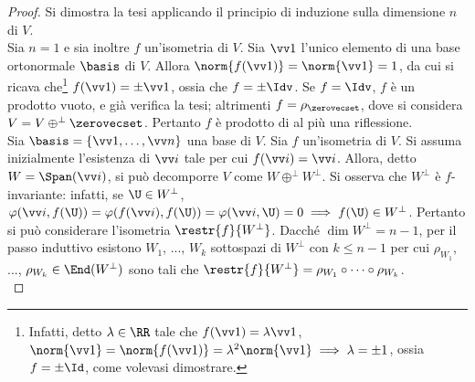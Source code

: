 \documentclass[11pt]{article}
\begin{document}
	\begin{proof}
		Si dimostra la tesi applicando il principio di induzione sulla dimensione $n$
		di $V$. \\
		
		\basestep Sia $n = 1$ e sia inoltre $f$ un'isometria di $V$. Sia $\vv 1$ l'unico elemento di una base ortonormale $\basis$ di $V$. Allora $\norm{f(\vv 1)} = \norm{\vv 1} = 1$, da cui si ricava che\footnote{Infatti, detto $\lambda \in \RR$ tale che $f(\vv 1) = \lambda \vv 1$, $\norm{\vv 1} = \norm{f(\vv 1)} = \lambda^2 \norm{\vv 1} \implies \lambda = \pm 1$, ossia $f = \pm \Id$, come volevasi dimostrare.} $f(\vv 1) = \pm \vv 1$,
		ossia che $f = \pm \Idv$. Se $f = \Idv$, $f$ è un prodotto vuoto, e già verifica la tesi; altrimenti
		$f = \rho_{\zerovecset}$, dove si considera $V = V \oplus^\perp \zerovecset$. Pertanto $f$ è prodotto
		di al più una riflessione. \\
		
		\inductivestep Sia $\basis = \{ \vv1, \ldots, \vv n \}$ una base di $V$. Sia $f$ un'isometria di $V$. Si
		assuma inizialmente l'esistenza di $\vv i$ tale per cui $f(\vv i) = \vv i$. Allora, detto $W = \Span(\vv i)$, si può decomporre $V$ come $W \oplus^\perp W^\perp$. Si osserva che $W^\perp$ è $f$-invariante: infatti,
		se $\U \in W^\perp$, $\varphi(\vv i, f(\U)) = \varphi(f(\vv i), f(\U)) = \varphi(\vv i, \U) = 0 \implies
		f(\U) \in W^\perp$. Pertanto si può considerare l'isometria $\restr{f}{W^\perp}$. Dacché $\dim W^\perp = n - 1$,
		per il passo induttivo esistono $W_1$, ..., $W_k$ sottospazi di $W^\perp$ con $k \leq n-1$ per cui $\rho_{W_1}$, ..., $\rho_{W_k} \in \End(W^\perp)$ sono tali che $\restr{f}{W^\perp} = \rho_{W_1} \circ \cdots \circ \rho_{W_k}$. \\
		

\end{proof}
\end{document}

